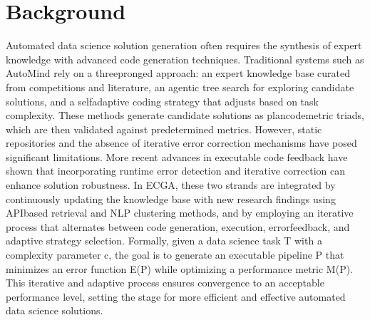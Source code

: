 \documentclass{article} %
\begin{document}
\section{Background}
\label{sec:background}
Automated data science solution generation often requires the synthesis of expert knowledge with advanced code generation techniques. Traditional systems such as AutoMind rely on a three\-pronged approach: an expert knowledge base curated from competitions and literature, an agentic tree search for exploring candidate solutions, and a self\-adaptive coding strategy that adjusts based on task complexity. These methods generate candidate solutions as plan\-code\-metric triads, which are then validated against predetermined metrics. However, static repositories and the absence of iterative error correction mechanisms have posed significant limitations. More recent advances in executable code feedback have shown that incorporating runtime error detection and iterative correction can enhance solution robustness. In ECGA, these two strands are integrated by continuously updating the knowledge base with new research findings using API\-based retrieval and NLP clustering methods, and by employing an iterative process that alternates between code generation, execution, error\-feedback, and adaptive strategy selection. Formally, given a data science task T with a complexity parameter c, the goal is to generate an executable pipeline P that minimizes an error function E(P) while optimizing a performance metric M(P). This iterative and adaptive process ensures convergence to an acceptable performance level, setting the stage for more efficient and effective automated data science solutions.
\end{document}
